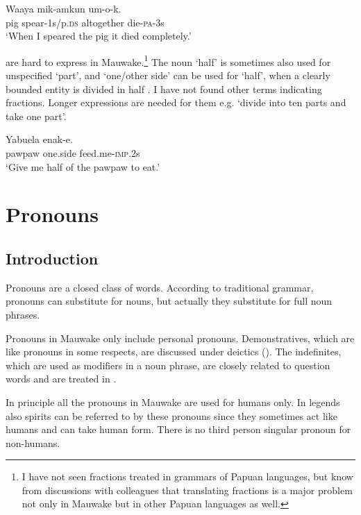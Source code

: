 \ea%
\label{ex:3:x513}
\gll Waaya mik-amkun  um-o-k. \\
pig spear-1s/p.\textsc{ds} altogether die-\textsc{pa}-3s\\
\glt`When I speared the pig it died completely.'
\z

 are hard to express in Mauwake.\footnote{I have not seen fractions treated in grammars of Papuan languages, but know from discussions with colleagues that translating fractions is a major problem not only in Mauwake but in other Papuan languages as well.} The noun  `half' is sometimes also used for unspecified `part', and  `one/other side' can be used for `half', when a clearly bounded entity is divided in half . I have not found other terms indicating fractions. Longer expressions are needed for them e.g. `divide into ten parts and take one part'.

\ea%
\label{ex:3:x104}
\gll Yabuela  enak-e. \\
pawpaw one.side feed.me-\textsc{imp}.2s\\
\glt`Give me half of the pawpaw to eat.'
\z

\section{Pronouns}\label{sec:3.5}\footnotemark{}
{}
\subsection{Introduction}\label{sec:3:y:x}
{}
Pronouns are a closed class of words. According to traditional grammar, pronouns can substitute for nouns, but actually they substitute for full noun phrases. 

Pronouns in Mauwake only include personal pronouns. Demonstratives, which are like pronouns in some respects, are discussed under deictics (). The indefinites, which are used as modifiers in a noun phrase, are closely related to question words and are treated in .

In principle all the pronouns in Mauwake are used for humans only. In legends also spirits can be referred to by these pronouns since they sometimes act like humans and can take human form. There is no third person singular pronoun for non-humans. 

